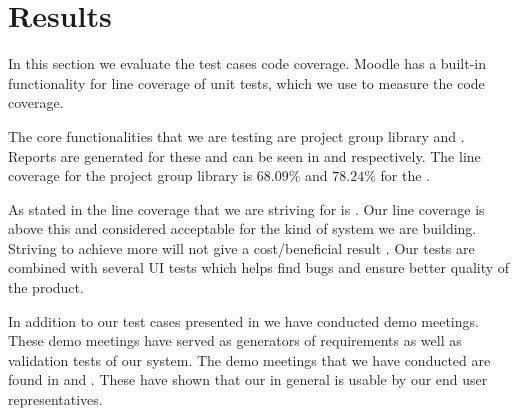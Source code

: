 \section{Results}
\label{sec:results}
In this section we evaluate the test cases code coverage. 
Moodle has a built-in functionality for line coverage of unit tests, which we use to measure the code coverage.

The core functionalities that we are testing are project group library and \admlib{}.
Reports are generated for these and can be seen in  and  respectively.
The line coverage for the project group library is $68.09\%$ and $78.24\%$ for the \admlib{}.

As stated in  the line coverage that we are striving for is \idealCC{}.
Our line coverage is above this and considered acceptable for the kind of system we are building. 
Striving to achieve more will not give a cost/beneficial result .
Our tests are combined with several UI tests which helps find bugs and ensure better quality of the product.

In addition to our test cases presented in  we have conducted demo meetings.
These demo meetings have served as generators of requirements as well as validation tests of our system.
The demo meetings that we have conducted are found in  and .
These have shown that our \subsystem{} in general is usable by our end user representatives.